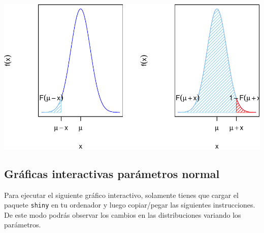 \documentclass[]{book}
\begin{document}
\begin{center}\includegraphics{curso-probabilidad-udemy_files/figure-latex/unnamed-chunk-100-1} \end{center}

\hypertarget{gruxe1ficas-interactivas-paruxe1metros-normal}{%
\subsection{Gráficas interactivas parámetros normal}\label{gruxe1ficas-interactivas-paruxe1metros-normal}}

Para ejecutar el siguiente gráfico interactivo, solamente tienes que cargar el paquete \texttt{shiny} en tu ordenador y luego copiar/pegar las siguientes instrucciones. De este modo podrás observar los cambios en las distribuciones variando los parámetros.
\end{document}
